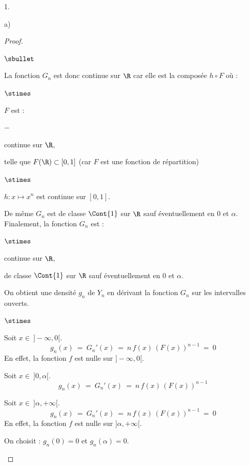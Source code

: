 \begin{noliste}{1.}
\begin{noliste}{a)}
\begin{proof}
\begin{noliste}{$\sbullet$}
	\item La fonction $G_n$ est donc continue sur $\R$ car elle est 
	la composée $h \circ F$ où :
	\begin{noliste}{$\stimes$}
	  \item $F$ est : 
	\end{noliste}
	  \begin{liste}{$-$}
	    \item continue sur $\R$,
	    \item telle que $F(\R) \subset [0,1]$ (car $F$ est une 
	    fonction de répartition)
	  \end{liste}
	\begin{noliste}{$\stimes$}
	  \item $h:x \mapsto x^n$ est continue sur $[0,1]$.
	\end{noliste}
	
	\item De même $G_n$ est de classe $\Cont{1}$ sur $\R$ 
	sauf éventuellement en $0$ et $\alpha$.\\
	Finalement, la fonction $G_n$ est :
	\begin{noliste}{$\stimes$}
	  \item continue sur $\R$,
	  \item de classe $\Cont{1}$ sur $\R$ sauf éventuellement en 
	  $0$ et $\alpha$.
	\end{noliste}
	
	\item On obtient une densité $g_n$ de $Y_n$ en dérivant la 
	fonction $G_n$ sur les intervalles ouverts.
	\begin{noliste}{$\stimes$}
	  \item Soit $x \in \ ]-\infty, 0[$.
	  \[
	    g_n(x) \ = \ G_n'(x) \ = \ n \, f(x) \, (F(x))^{n-1}
	    \ = \ 0
	  \]
	  En effet, la fonction $f$ est nulle sur $]-\infty, 0[$.
	  
	  \item Soit $x \in \ ]0, \alpha[$.
	  \[
	    g_n(x) \ = \ G_n'(x) \ = \ n \, f(x) \, (F(x))^{n-1}
	  \]
	  
	  \item Soit $x \in \ ] \alpha, + \infty[$.
	  \[
	    g_n(x) \ = \ G_n'(x) \ = \ n \, f(x) \, (F(x))^{n-1}
	    \ = \ 0
	  \]
	  En effet, la fonction $f$ est nulle sur $]\alpha, +\infty[$.
	  
	  \item On choisit : $g_n(0)=0$ et $g_n(\alpha)=0$.
	\end{noliste}
	

\end{noliste}
\end{proof}
\end{noliste}
\end{noliste}
